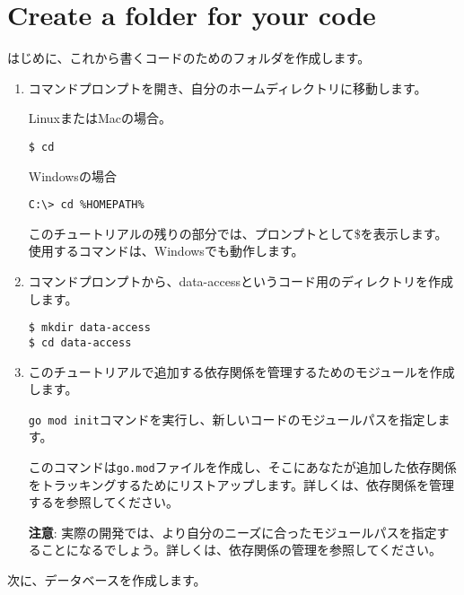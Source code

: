 \section{Create a folder for your code}

はじめに、これから書くコードのためのフォルダを作成します。

\begin{enumerate}
\item コマンドプロンプトを開き、自分のホームディレクトリに移動します。

LinuxまたはMacの場合。

\begin{lstlisting}[numbers=none]
$ cd
\end{lstlisting}

Windowsの場合

\begin{lstlisting}[numbers=none]
C:\> cd %HOMEPATH%
\end{lstlisting}

このチュートリアルの残りの部分では、プロンプトとして\$を表示します。使用するコマンドは、Windowsでも動作します。

\item コマンドプロンプトから、data-accessというコード用のディレクトリを作成します。

\begin{lstlisting}[numbers=none]
$ mkdir data-access
$ cd data-access
\end{lstlisting}

\item このチュートリアルで追加する依存関係を管理するためのモジュールを作成します。

\texttt{go mod init}コマンドを実行し、新しいコードのモジュールパスを指定します。


このコマンドは\texttt{go.mod}ファイルを作成し、そこにあなたが追加した依存関係をトラッキングするためにリストアップします。詳しくは、依存関係を管理するを参照してください。

\textbf{注意}: 実際の開発では、より自分のニーズに合ったモジュールパスを指定することになるでしょう。詳しくは、依存関係の管理を参照してください。

\end{enumerate}

次に、データベースを作成します。
